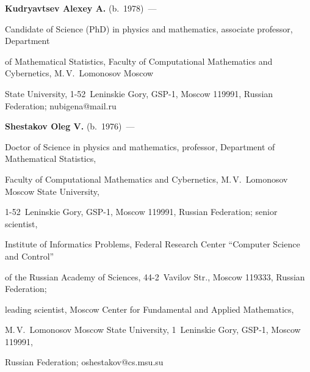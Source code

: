 \noindent


\textbf{Kudryavtsev Alexey A.} (b.\ 1978)~--- 


Candidate of Science (PhD) in physics and mathematics, associate professor, Department 


of Mathematical Statistics, Faculty of Computational Mathematics and Cybernetics, M.\,V.~Lomonosov Moscow 


State University, 1-52~Leninskie Gory, GSP-1, Moscow 119991, Russian Federation; \mbox{nubigena@mail.ru}





\vspace*{6pt}





\noindent


\textbf{Shestakov Oleg V.} (b.\ 1976)~--- 


Doctor of Science in physics and mathematics, professor, Department of Mathematical Statistics, 


Faculty of Computational Mathematics and Cybernetics, M.\,V.~Lomonosov Moscow State University, 


\mbox{1-52}~Leninskie Gory, GSP-1, Moscow 119991, Russian Federation; senior scientist, 


Institute of Informatics Problems, Federal Research Center ``Computer Science and Control'' 


of the Russian Academy of Sciences, 44-2~Vavilov Str., Moscow 119333, Russian Federation; 


leading scientist, Moscow Center for Fundamental and Applied Mathematics, 


M.\,V.~Lomonosov Moscow State University, 1~Leninskie Gory, GSP-1, Moscow 119991, 


Russian Federation; \mbox{oshestakov@cs.msu.su}





\label{end\stat}





\renewcommand{\bibname}{\protect\rm Литература} 


